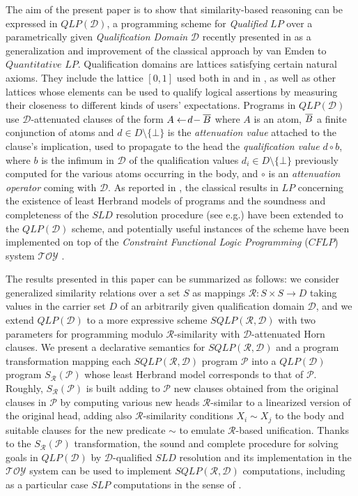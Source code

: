 \documentclass{sigplanconf}
\newcommand{\toy}{\mathcal{TOY}} \newcommand{\NAT}{\mathbb{N}} \newcommand{\REAL}{\mathbb{R}}
\newcommand{\qdom}{\mathcal{D}} \newcommand{\dqdom}{D \setminus \{\bot\}} \newcommand{\bqdom}{(D \setminus \{\bot\}) \uplus \{?\}}
\newcommand{\simrel}{\mathcal{R}}
\newcommand{\qlp}[1]{QLP({#1})} \newcommand{\slp}[2]{SLP({#1,#2})} \newcommand{\sqlp}[2]{SQLP({#1,#2})} \newcommand{\bqlp}[1]{BQLP({#1})} \newcommand{\clp}[1]{CLP({#1})}
\newcommand{\trans}[2]{S_{#1}(#2)}
\newcommand{\Prog}{\mathcal{P}} \newcommand{\UProg}{\mathcal{P_U}}
\theoremstyle{definition}
\theoremstyle{plain}
\begin{document}
The aim of the present paper is to show that similarity-based reasoning can be expressed in $\qlp{\qdom}$, a programming scheme for {\em Qualified} $LP$ over a parametrically given {\em Qualification Domain} $\qdom$ recently presented in \cite{RR08} as a generalization and improvement of the classical approach by van Emden \cite{VE86} to $Quantitative$ $LP$. Qualification domains are lattices satisfying certain natural axioms. They include the lattice $[0,1]$ used both in \cite{VE86} and in \cite{Ses02}, as well as other lattices whose elements can be used to qualify logical
assertions by measuring their closeness to different kinds of users' expectations. Programs in $\qlp{\qdom}$ use $\qdom$-attenuated clauses of the form $A \gets\!d\!- \overline{B}$ where $A$ is an atom, $\overline{B}$ a finite conjunction of atoms and $d \in \dqdom$ is the {\em attenuation value} attached to the clause's implication, used to propagate to the head the {\em qualification value} $d \circ b$, where $b$ is the infimum in $\qdom$ of the qualification values $d_i \in \dqdom$ previously computed for the various atoms occurring in the body, and  $\circ$ is an {\em attenuation operator} coming
with $\qdom$. As reported in \cite{RR08,RR08TR}, the classical results in $LP$ concerning the existence of least Herbrand models of programs and the soundness and completeness of the  $SLD$ resolution procedure (see e.g.\cite{VEK76,AVE82,Apt90}) have been extended to the $\qlp{\qdom}$ scheme, and potentially useful instances of the scheme have been implemented on top of the {\em Constraint Functional Logic Programming} ($CFLP$) system $\toy$ \cite{toy}.

The results presented in this paper can be summarized as follows: we consider generalized similarity relations over a set $S$ as mappings $\simrel: S \times S \to D$ taking values in the carrier set $D$ of an arbitrarily  given qualification domain $\qdom$, and we  extend $\qlp{\qdom}$ to a more expressive scheme $\sqlp{\simrel}{\qdom}$ with two parameters for programming modulo $\simrel$-similarity with $\qdom$-attenuated Horn clauses. We present a declarative semantics for $\sqlp{\simrel}{\qdom}$ and a program transformation mapping each $\sqlp{\simrel}{\qdom}$ program $\Prog$ into a
$\qlp{\qdom}$ program $\trans{\simrel}{\Prog}$ whose least Herbrand model corresponds to that of $\Prog$. Roughly, $\trans{\simrel}{\Prog}$ is built adding to $\Prog$ new clauses obtained from the original clauses in $\Prog$ by computing various new heads $\simrel$-similar to a linearized version of the original head, adding also $\simrel$-similarity conditions $X_i \sim X_j$  to the body and suitable clauses for  the  new predicate $\sim$ to
emulate $\simrel$-based unification. Thanks to the $\trans{\simrel}{\Prog}$ transformation, the sound and complete procedure for solving goals in $\qlp{\qdom}$ by $\qdom$-qualified $SLD$ resolution and its implementation in the $\toy$ system \cite{RR08} can be used to implement $\sqlp{\simrel}{\qdom}$ computations, including as a particular case $SLP$ computations in the sense of \cite{Ses02}.
\end{document}
